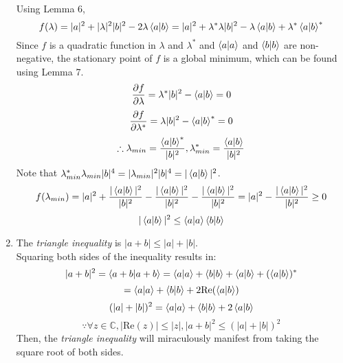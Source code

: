 \begin{sol}
\begin{enumerate}[label=\textbf{(\alph*)}]
\begin{equation}
\end{equation} 
Using Lemma 6, 
\begin{equation}
	f(\lambda)=|a|^2+|\lambda|^2|b|^2-2\lambda\braket{a}{b}=|a|^2+\lambda^*\lambda|b|^2-\lambda\braket{a}{b}+\lambda^*\braket{a}{b}^*
\end{equation}
Since $f$ is a quadratic function in $\lambda$ and $\lambda^*$ and $\braket{a}{a}$ and $\braket{b}{b}$ are non-negative, the stationary point of $f$ is a global minimum, which can be found using Lemma 7.
\begin{equation}
	\frac{\partial f}{\partial\lambda}=\lambda^*|b|^2-\braket{a}{b}=0
\end{equation} 
\begin{equation}
	\frac{\partial f}{\partial\lambda^*}=\lambda|b|^2-\braket{a}{b}^*=0
\end{equation} 
\begin{equation}
	\therefore\lambda_{min}=\frac{\braket{a}{b}^*}{|b|^2},\lambda^*_{min}=\frac{\braket{a}{b}}{|b|^2}
\end{equation}
Note that $\lambda_{min}^*\lambda_{min}|b|^4=|\lambda_{min}|^2|b|^4=|\braket{a}{b}|^2$.
\begin{equation}
	f(\lambda_{min})=|a|^2+\frac{|\braket{a}{b}|^2}{|b|^2}-\frac{|\braket{a}{b}|^2}{|b|^2}-\frac{|\braket{a}{b}|^2}{|b|^2}=|a|^2-\frac{|\braket{a}{b}|^2}{|b|^2}\geq 0
\end{equation}
\begin{equation}
	|\braket{a}{b}|^2\leq\braket{a}{a}\braket{b}{b}
\end{equation} 
\item
The \textit{triangle inequality} is $|a+b|\leq|a|+|b|$.\\
Squaring both sides of the inequality results in:
\begin{equation}
	|a+b|^2=\braket{a+b}{a+b}=\braket{a}{a}+\braket{b}{b}+\braket{a}{b}+(\braket{a}{b})^*
\end{equation}
\begin{equation}
	=\braket{a}{a}+\braket{b}{b}+2\text{Re}(\braket{a}{b})
\end{equation} 
\begin{equation}
	(|a|+|b|)^2=\braket{a}{a}+\braket{b}{b}+2\braket{a}{b}
\end{equation}
\begin{equation}
	\because\forall z\in\mathbb C, |\text{Re}(z)|\leq|z|, |a+b|^2\leq(|a|+|b|)^2
\end{equation} 
Then, the \textit{triangle inequality} will miraculously manifest from taking the square root of both sides.
\end{enumerate}
\end{sol}